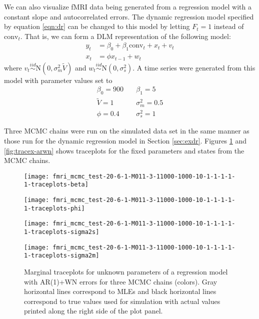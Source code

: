 \documentclass{article}
\begin{document}
We can also visualize fMRI data being generated from a regression model with a constant slope and autocorrelated errors. The dynamic regression model specified by equation \eqref{eqn:dr} can be changed to this model by letting $F_t = 1$ instead of $\mbox{conv}_t$. That is, we can form a DLM representation of the following model: 
\begin{align*}
y_t &= \beta_0 + \beta_1\mbox{conv}_t + x_t + v_t \\
x_t &= \phi x_{t-1} + w_t
\end{align*}
\noindent where $v_t \stackrel{iid}{\sim} \mbox{N}(0,\sigma^2_m\tilde{V})$ and $w_t \stackrel{iid}{\sim} \mbox{N}(0,\sigma^2_s)$. A time series were generated from this model with parameter values set to
\begin{align*}
\beta_0 = 900 &\quad \beta_1 = 5 \\
\tilde{V} = 1 &\quad \sigma_m^2 = 0.5 \\
\phi = 0.4 &\quad \sigma_s^2 = 1
\end{align*}

Three MCMC chains were run on the simulated data set in the same manner as those run for the dynamic regression model in Section \ref{sec:exdr}. Figures \ref{fig:tracetheta-arwn} and \ref{fig:tracex-arwn} shows traceplots for the fixed parameters and states from the MCMC chains.

\begin{figure}[ht]
\begin{minipage}{0.5\linewidth}
\texttt{[image: fmri\_mcmc\_test-20-6-1-M011-3-11000-1000-10-1-1-1-1-1-traceplots-beta]}
\end{minipage}
\begin{minipage}{0.5\linewidth}
\texttt{[image: fmri\_mcmc\_test-20-6-1-M011-3-11000-1000-10-1-1-1-1-1-traceplots-phi]}
\end{minipage}
\begin{minipage}{0.5\linewidth}
\texttt{[image: fmri\_mcmc\_test-20-6-1-M011-3-11000-1000-10-1-1-1-1-1-traceplots-sigma2s]}
\end{minipage}
\begin{minipage}{0.5\linewidth}
\texttt{[image: fmri\_mcmc\_test-20-6-1-M011-3-11000-1000-10-1-1-1-1-1-traceplots-sigma2m]}
\end{minipage}
\caption{Marginal traceplots for unknown parameters of a regression model with AR(1)+WN errors for three MCMC chains (colors). Gray horizontal lines correspond to MLEs and black horizontal lines correspond to true values used for simulation with actual values printed along the right side of the plot panel.} \label{fig:tracetheta-arwn}
\end{figure}
\end{document}
